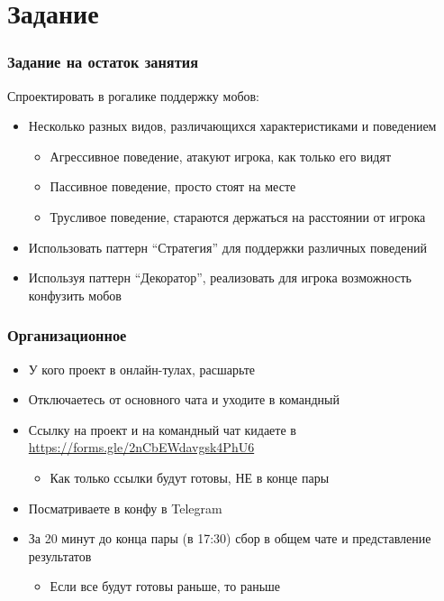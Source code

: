 \documentclass[xetex,mathserif,serif]{beamer}
\begin{document}
    \section{Задание}

    \begin{frame}
        \frametitle{Задание на остаток занятия}
        Спроектировать в рогалике поддержку мобов:
        \begin{itemize}
            \item Несколько разных видов, различающихся характеристиками и поведением
            \begin{itemize}
                \item Агрессивное поведение, атакуют игрока, как только его видят
                \item Пассивное поведение, просто стоят на месте
                \item Трусливое поведение, стараются держаться на расстоянии от игрока
            \end{itemize}
            \item Использовать паттерн ``Стратегия'' для поддержки различных поведений
            \item Используя паттерн ``Декоратор'', реализовать для игрока возможность конфузить мобов
        \end{itemize}
    \end{frame}

    \begin{frame}
        \frametitle{Организационное}
        \begin{itemize}
            \item У кого проект в онлайн-тулах, расшарьте
            \item Отключаетесь от основного чата и уходите в командный
            \item Ссылку на проект и на командный чат кидаете в \url{https://forms.gle/2nCbEWdavgsk4PhU6}
            \begin{itemize}
                \item Как только ссылки будут готовы, НЕ в конце пары
            \end{itemize}
            \item Посматриваете в конфу в Telegram
            \item За 20 минут до конца пары (в 17:30) сбор в общем чате и представление результатов
            \begin{itemize}
                \item Если все будут готовы раньше, то раньше
            \end{itemize}
        \end{itemize}
    \end{frame}
\end{document}
